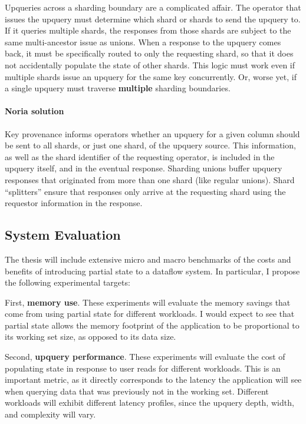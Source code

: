 \documentclass[12pt,letterpaper,twoside]{article}
\begin{document}
Upqueries across a sharding boundary are a complicated affair. The
operator that issues the upquery must determine which shard or shards to
send the upquery to. If it queries multiple shards, the responses from
those shards are subject to the same multi-ancestor issue as unions.
When a response to the upquery comes back, it must be specifically
routed to only the requesting shard, so that it does not accidentally
populate the state of other shards. This logic must work even if
multiple shards issue an upquery for the same key concurrently. Or,
worse yet, if a single upquery must traverse \textbf{multiple} sharding
boundaries.

\paragraph{Noria solution}
Key provenance informs operators whether an upquery for a given column should be
sent to all shards, or just one shard, of the upquery source. This information,
as well as the shard identifier of the requesting operator, is included in the
upquery itself, and in the eventual response. Sharding unions buffer upquery
responses that originated from more than one shard (like regular unions). Shard
``splitters'' ensure that responses only arrive at the requesting shard using
the requestor information in the response.

\subsection{System Evaluation}
\label{s:eval}

The thesis will include extensive micro and macro benchmarks of the
costs and benefits of introducing partial state to a dataflow system. In
particular, I propose the following experimental targets:

First, \textbf{memory use}. These experiments will evaluate the memory
savings that come from using partial state for different workloads. I
would expect to see that partial state allows the memory footprint of
the application to be proportional to its working set size, as opposed
to its data size.

Second, \textbf{upquery performance}. These experiments will evaluate the
cost of populating state in response to user reads for different
workloads. This is an important metric, as it directly corresponds to
the latency the application will see when querying data that was
previously not in the working set. Different workloads will exhibit
different latency profiles, since the upquery depth, width, and
complexity will vary.
\end{document}
